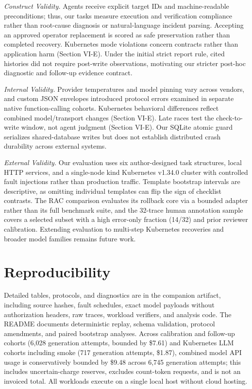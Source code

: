 \documentclass[conference,10pt]{IEEEtran}
\begin{document}
\emph{Construct Validity.} Agents receive explicit target IDs and machine\hyp{}readable preconditions; thus, our tasks measure execution and verification compliance rather than root\hyp{}cause diagnosis or natural\hyp{}language incident parsing. Accepting an approved operator replacement is scored as safe preservation rather than completed recovery. Kubernetes mode violations concern contracts rather than application harm (Section VI\hyp{}E). Under the initial strict report rule, cited histories did not require post\hyp{}write observations, motivating our stricter post\hyp{}hoc diagnostic and follow\hyp{}up evidence contract.

\emph{Internal Validity.} Provider temperatures and model pinning vary across vendors, and custom JSON envelopes introduced protocol errors examined in separate native function\hyp{}calling cohorts. Kubernetes behavioral differences reflect combined model/transport changes (Section VI\hyp{}E). Late races test the check\hyp{}to\hyp{}write window, not agent judgment (Section VI\hyp{}E). Our SQLite atomic guard serializes shared\hyp{}database writes but does not establish distributed crash durability across external systems.

\emph{External Validity.} Our evaluation uses six author\hyp{}designed task structures, local HTTP services, and a single\hyp{}node kind Kubernetes v1.34.0 cluster with controlled fault injections rather than production traffic. Template bootstrap intervals are descriptive, as omitting individual templates can flip the sign of checklist contrasts. The RAC comparison evaluates its rollback core via a bounded adapter rather than its full benchmark suite, and the 32-trace human annotation sample covers a selected subset with a high error\hyp{}only fraction (14/32) and prior reviewer calibration. Extending evaluation to multi\hyp{}step Kubernetes recoveries and broader model families remains future work.

\section{Reproducibility}

Detailed tables, protocols, and diagnostics are in the companion artifact, including source hashes, fault schedules, exact model payloads without authorization headers, raw traces, workload verifiers, and analysis code. The README documents deterministic replay, schema validation, protocol amendments, and paired bootstrap analyses. Across calibration and follow\hyp{}up cohorts (6,028 generation attempts, bounded by \$7.61) and Kubernetes LLM cohorts including smoke (717 generation attempts, \$1.87), combined model API usage is conservatively bounded by \$9.48 across 6,745 generation attempts; this includes uncertain\hyp{}charge reserves, excludes count\hyp{}token requests, and is not an invoiced total. All workloads execute on a single local host without cloud hosting.
\end{document}
